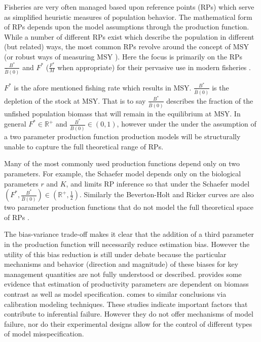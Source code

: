 \documentclass[12pt]{article}
\begin{document}
%
Fisheries are very often managed based upon reference points (RPs) which serve as
simplified heuristic measures of population behavior. The mathematical form of
RPs depends upon the model assumptions through the production function. %
While a number of different RPs exist which describe the population in different
(but related) ways, the most common RPs revolve around the concept of MSY (or robust
ways of measuring MSY ).
Here the focus is primarily on the RPs $\frac{B^*}{\bar B(0)}$ and $F^*$ ($\frac{F^*}{M}$ when appropriate)
for their pervasive use in modern fisheries . %

%
$F^*$ is the afore mentioned fishing rate which results in MSY. $\frac{B^*}{\bar B(0)}$
is the depletion of the stock at MSY. That is to say $\frac{B^*}{\bar B(0)}$ describes
the fraction of the unfished population biomass that will remain in the equilibrium
at MSY. In general $F^*\in\mathbb{R}^+$ and \mbox{$\frac{B^*}{\bar B(0)}\in\left(0, 1\right)$,}
however under the under the assumption of a two parameter production function production 
models will be structurally unable to capture the full theoretical range of RPs. 

%
Many of the most commonly used production functions depend only
on two parameters. For example, the Schaefer model %
depends only on the biological parameters $r$ and $K$, and limits RP inference 
so that under the Schaefer model $\left(F^*, \frac{B^*}{\bar B(0)}\right)\in \left(\mathbb{R}^+, \frac{1}{2}\right)$. 
Similarly the Beverton-Holt 
and Ricker  curves are also two parameter
production functions that do not model the full theoretical space of
RPs .

%
The bias-variance trade-off  makes it
clear that the addition of a third parameter in the production function will
necessarily reduce estimation bias. However the utility of this bias reduction
is still under debate because the particular mechanisms and behavior (direction and magnitude) %
of these biases for key management quantities %
are not fully understood or described.  provides some
evidence that estimation of productivity parameters %
are dependent on biomass contrast as well as model specification. %
 comes to similar conclusions %
via calibration modeling techniques. These studies indicate important factors that
contribute to inferential failure. However they do not offer mechanisms of model 
failure, nor do their experimental designs allow for the control of different 
types of model misspecification.
\end{document}
